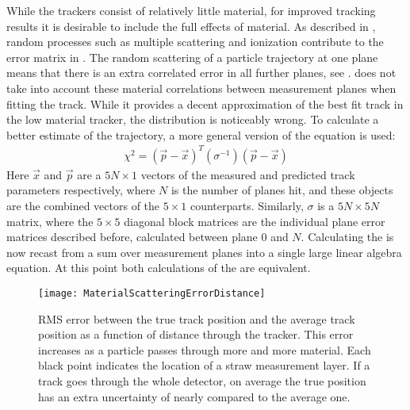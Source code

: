 While the trackers consist of relatively little material, for improved tracking results it is desirable to include the full effects of material. As described in , random processes such as multiple scattering and ionization contribute to the error matrix in . The random scattering of a particle trajectory at one plane means that there is an extra correlated error in all further planes, see .  does not take into account these material correlations between measurement planes when fitting the track. While it provides a decent approximation of the best fit track in the low material tracker, the \chisq distribution is noticeably wrong. To calculate a better estimate of the trajectory, a more general version of the \chisq equation is used:
        \begin{align} \label{eq:chi2full}
            \chi^2 = (\vec{p}-\vec{x})^{T} (\sigma^{-1}) (\vec{p}-\vec{x})
        \end{align}
Here $\vec{x}$ and $\vec{p}$ are a $5N \times 1$ vectors of the measured and predicted track parameters respectively, where $N$ is the number of planes hit, and these objects are the combined vectors of the $5 \times 1$ counterparts. Similarly, $\sigma$ is a $5N \times 5N$ matrix, where the $5 \times 5$ diagonal block matrices are the individual plane error matrices described before, calculated between plane 0 and $N$. Calculating the \chisq is now recast from a sum over measurement planes into a single large linear algebra equation. At this point both calculations of the \chisq are equivalent.


\begin{figure}
  \centering
  \texttt{[image: MaterialScatteringErrorDistance]}
    \caption[Material scattering error in tracker]{RMS error between the true track position and the average track position as a function of distance through the tracker. This error increases as a particle passes through more and more material. Each black point indicates the location of a straw measurement layer. If a track goes through the whole detector, on average the true position has an extra uncertainty of nearly  compared to the average one.}
    \label{fig:MaterialScatteringErrorDistance}
\end{figure}





